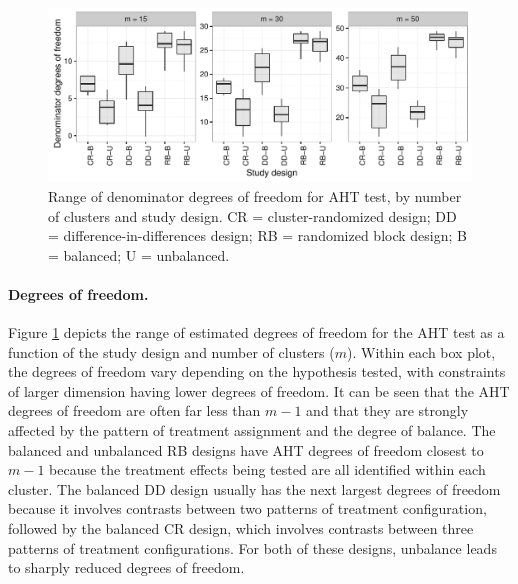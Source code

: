 \documentclass[12pt]{article}\usepackage[]{graphicx}\usepackage[]{color}
\newenvironment{knitrout}{}{} %
\begin{document}
\begin{knitrout}
\color{fgcolor}\begin{figure}

{\centering \includegraphics[width=\linewidth]{CR_fig/df-1} 

}

\caption[Range of denominator degrees of freedom for AHT test, by number of clusters and study design]{Range of denominator degrees of freedom for AHT test, by number of clusters and study design. CR = cluster-randomized design; DD = difference-in-differences design; RB = randomized block design; B = balanced; U = unbalanced.}\label{fig:df}
\end{figure}


\end{knitrout}

\paragraph{Degrees of freedom.} Figure \ref{fig:df} depicts the range of estimated degrees of freedom for the AHT test as a function of the study design and number of clusters ($m$). 
Within each box plot, the degrees of freedom vary depending on the hypothesis tested, with constraints of larger dimension having lower degrees of freedom. 
It can be seen that the AHT degrees of freedom are often far less than $m - 1$ and that they are strongly affected by the pattern of treatment assignment and the degree of balance. The balanced and unbalanced RB designs have AHT degrees of freedom closest to $m - 1$ because the treatment effects being tested are all identified within each cluster. 
The balanced DD design usually has the next largest degrees of freedom because it involves contrasts between two patterns of treatment configuration, followed by the balanced CR design, which involves contrasts between three patterns of treatment configurations. 
For both of these designs, unbalance leads to sharply reduced degrees of freedom.
\end{document}
